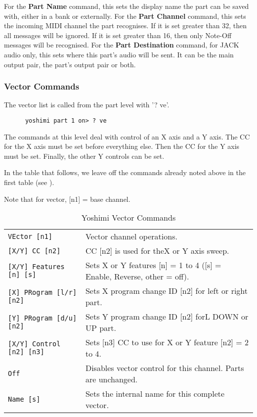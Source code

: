    For the \textbf{Part Name} command, this sets the display name the part can
   be saved with, either in a bank or externally.
   For the \textbf{Part Channel} command, this sets the incoming MIDI channel
   the part recognises. If it is set greater than 32, then all messages will be
   ignored.  If it is set greater than 16, then only Note-Off messages will be
   recognised.
   For the \textbf{Part Destination} command, for JACK audio only,
   this sets where this part's audio will be sent. It can be the main output
   pair, the part's output pair or both.

\subsubsection{Vector Commands}
\label{subsec:command_line_vector_command_list}

   The vector list is called from the part level with '? ve'.

   \begin{verbatim}
      yoshimi part 1 on> ? ve
   \end{verbatim}

   The commands at this level deal with control of an X axis and a Y axis.
   The CC for the X axis must be set before everything else.  Then the CC for
   the Y axis must be set.  Finally, the other Y controls can be set.

   In the table that follows, we leave off the commands already noted
   above in the first table
   (see ).

   Note that for vector, [n1] = base channel.

   \begin{table}[H]
      \centering
      \caption{Yoshimi Vector Commands}
      \label{table:yoshimi_text_vector_commands}
      \begin{tabular}{l l}

\texttt{VEctor [n1]} &
   Vector channel operations. \\
\texttt{[X/Y] CC [n2]} &
   CC [n2] is used for theX or Y axis sweep. \\
\texttt{[X/Y] Features [n] [s]} &
   Sets X or Y features [n] = 1 to 4 ([s] = Enable, Reverse, other = off).  \\
\texttt{[X] PRogram [l/r] [n2]} &
   Sets X program change ID [n2] for left or right part. \\
\texttt{[Y] PRogram [d/u] [n2]} &
   Sets Y program change ID [n2] forL DOWN or UP part. \\
\texttt{[X/Y] Control [n2] [n3]} &
   Sets [n3] CC to use for X or Y feature [n2] = 2 to 4. \\
\texttt{Off} &
   Disables vector control for this channel.  Parts are unchanged. \\
\texttt{Name [s]} &
   Sets the internal name for this complete vector.  \\

      \end{tabular}
   \end{table}

